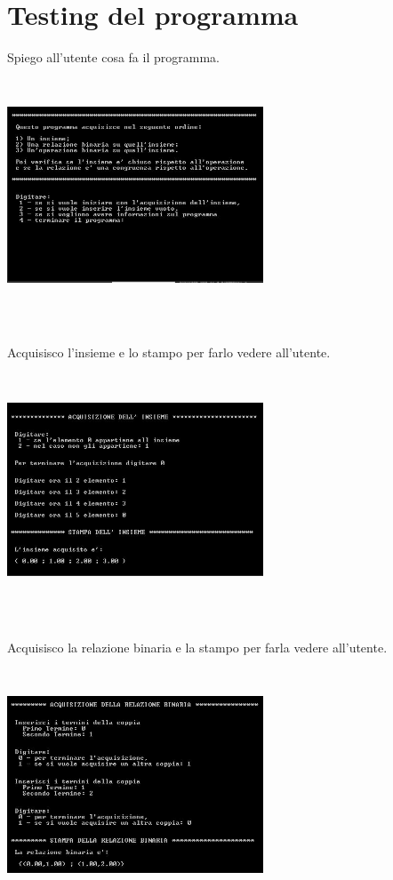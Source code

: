 \documentclass[11pt,a4paper,titlepage,block]{article}
\begin{document}
\section {Testing del programma}
Spiego all'utente cosa fa il programma.
\\
\includegraphics[width=3in,height=3in,viewport=0 0 300 300]{../Screenshots/Capture1.JPG}
\\
\\
Acquisisco l'insieme e lo stampo per farlo vedere all'utente.\\
\includegraphics[width=3in,height=3in,viewport=0 0 300 300]{../Screenshots/Capture2.JPG}\\
\\
\newpage
Acquisisco la relazione binaria e la stampo per farla vedere all'utente.\\
\includegraphics[width=3in,height=3in,viewport=0 0 300 300]{../Screenshots/Capture3.JPG}\\
\end{document}
